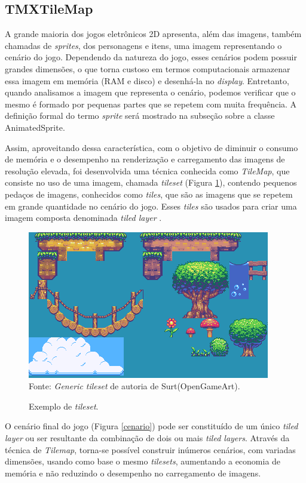 \subsection{TMXTileMap}
%
%
%
A grande maioria dos jogos eletrônicos 2D apresenta, além das imagens, também chamadas de \textit{sprites}, dos personagens e itens, uma imagem representando o cenário do jogo. Dependendo da natureza do jogo, esses cenários podem possuir grandes dimensões, o que torna custoso em termos computacionais armazenar essa imagem em memória (RAM e disco) e desenhá-la no \textit{display}. Entretanto, quando analisamos a imagem que representa o cenário, podemos verificar que o mesmo é formado por pequenas partes que se repetem com muita frequência. A definição formal do termo \textit{sprite} será mostrado na subseção sobre a classe AnimatedSprite.
\par
Assim, aproveitando dessa característica, com o objetivo de diminuir o consumo de memória e o desempenho na renderização e carregamento das imagens de resolução elevada, foi desenvolvida uma técnica conhecida como \textit{TileMap}, que consiste no uso de uma imagem, chamada \textit{tileset} (Figura \ref{tileset_edit}), contendo pequenos pedaços de imagens, conhecidos como \textit{tiles}, que são as imagens que se repetem em grande quantidade no cenário do jogo. Esses \textit{tiles} são usados para criar uma imagem composta denominada \textit{tiled layer} \cite{Novak}.
%
%
\begin{figure}[H]
    \centering
    \caption{Exemplo de \textit{tileset}.}
    \label{tileset_edit}
    \includegraphics[scale = 1.0]{Imagens/tileset_edit.png}
    \\Fonte: \textit{Generic tileset} de autoria de Surt(OpenGameArt).
\end{figure}
%
\par
O cenário final do jogo (Figura \ref{cenario}) pode ser constituído de um único \textit{tiled layer} ou ser resultante da combinação de dois ou mais \textit{tiled layers}. Através da técnica de \textit{Tilemap}, torna-se possível construir inúmeros cenários, com variadas dimensões, usando como base o mesmo \textit{tilesets}, aumentando a economia de memória e não reduzindo o desempenho no carregamento de imagens.
